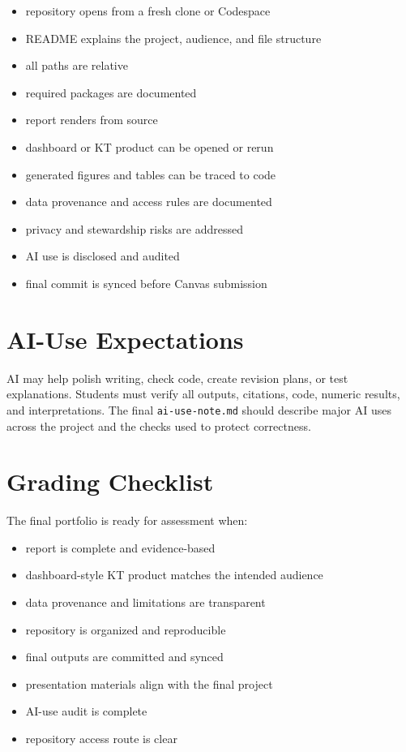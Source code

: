 \documentclass[
  letterpaper,
  DIV=11,
  numbers=noendperiod,
  oneside]{scrreprt}
\providecommand{\tightlist}{%
  \setlength{\itemsep}{0pt}\setlength{\parskip}{0pt}}
\begin{document}
\begin{itemize}
\tightlist
\item
  repository opens from a fresh clone or Codespace
\item
  README explains the project, audience, and file structure
\item
  all paths are relative
\item
  required packages are documented
\item
  report renders from source
\item
  dashboard or KT product can be opened or rerun
\item
  generated figures and tables can be traced to code
\item
  data provenance and access rules are documented
\item
  privacy and stewardship risks are addressed
\item
  AI use is disclosed and audited
\item
  final commit is synced before Canvas submission
\end{itemize}

\section{AI-Use Expectations}\label{ai-use-expectations-7}

AI may help polish writing, check code, create revision plans, or test
explanations. Students must verify all outputs, citations, code, numeric
results, and interpretations. The final \texttt{ai-use-note.md} should
describe major AI uses across the project and the checks used to protect
correctness.

\section{Grading Checklist}\label{grading-checklist-5}

The final portfolio is ready for assessment when:

\begin{itemize}
\tightlist
\item
  report is complete and evidence-based
\item
  dashboard-style KT product matches the intended audience
\item
  data provenance and limitations are transparent
\item
  repository is organized and reproducible
\item
  final outputs are committed and synced
\item
  presentation materials align with the final project
\item
  AI-use audit is complete
\item
  repository access route is clear
\end{itemize}
\end{document}
